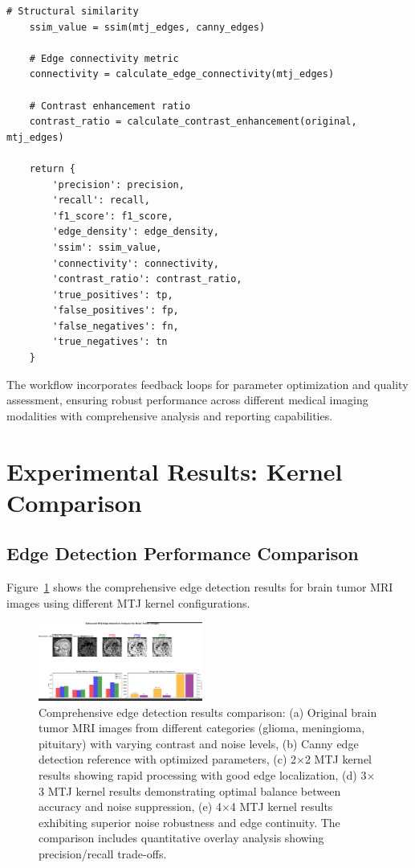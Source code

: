\documentclass[conference]{IEEEtran}
\begin{document}
\begin{lstlisting}[caption={Complete workflow management system}]
    # Structural similarity
    ssim_value = ssim(mtj_edges, canny_edges)
    
    # Edge connectivity metric
    connectivity = calculate_edge_connectivity(mtj_edges)
    
    # Contrast enhancement ratio
    contrast_ratio = calculate_contrast_enhancement(original, mtj_edges)
    
    return {
        'precision': precision,
        'recall': recall,
        'f1_score': f1_score,
        'edge_density': edge_density,
        'ssim': ssim_value,
        'connectivity': connectivity,
        'contrast_ratio': contrast_ratio,
        'true_positives': tp,
        'false_positives': fp,
        'false_negatives': fn,
        'true_negatives': tn
    }
\end{lstlisting}

The workflow incorporates feedback loops for parameter optimization and quality assessment, ensuring robust performance across different medical imaging modalities with comprehensive analysis and reporting capabilities.

\section{Experimental Results: Kernel Comparison}

\subsection{Edge Detection Performance Comparison}

Figure~\ref{fig:kernel_results} shows the comprehensive edge detection results for brain tumor MRI images using different MTJ kernel configurations.

\begin{figure}[htbp]
\centerline{\includegraphics[width=0.48\textwidth]{Screenshot 2025-07-12 123903.png}}
\caption{Comprehensive edge detection results comparison: (a) Original brain tumor MRI images from different categories (glioma, meningioma, pituitary) with varying contrast and noise levels, (b) Canny edge detection reference with optimized parameters, (c) 2$\times$2 MTJ kernel results showing rapid processing with good edge localization, (d) 3$\times$3 MTJ kernel results demonstrating optimal balance between accuracy and noise suppression, (e) 4$\times$4 MTJ kernel results exhibiting superior noise robustness and edge continuity. The comparison includes quantitative overlay analysis showing precision/recall trade-offs.}
\label{fig:kernel_results}
\end{figure}
\end{document}

